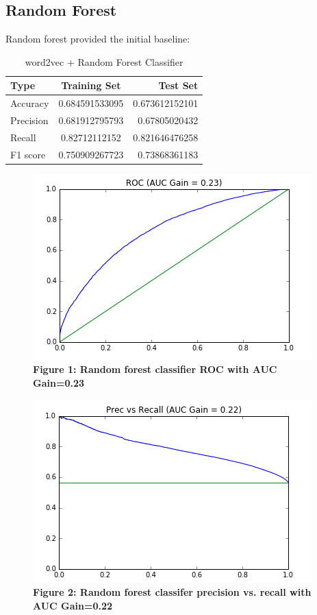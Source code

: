 \documentclass[11pt,a4paper]{article}
\begin{document}
\subsection{Random Forest}
Random forest provided the initial baseline:
\begin{table}[h!]
	\begin{center}
		\caption{word2vec + Random Forest Classifier}
		\label{tab:table1}
		\begin{tabular}{l|c|r} %
			\textbf{Type} & \textbf{Training Set} & \textbf{Test Set}\\
			\hline
			Accuracy & 0.684591533095 & 0.673612152101 \\
			Precision & 0.681912795793 & 0.67805020432 \\
			Recall & 0.82712112152  & 0.821646476258\\
			F1 score & 0.750909267723 & 0.73868361183
		\end{tabular}
	\end{center}
\end{table}


\begin{figure}[H]
	\centering\includegraphics[scale=0.55]{ROC_rf} 
	\caption{\textbf{Figure 1: Random forest classifier ROC with AUC Gain=0.23 }}
\end{figure}


\begin{figure}[H]
	\centering\includegraphics[scale=0.55]{prrc_rf} 
	\caption{\textbf{Figure 2: Random forest classifer precision vs. recall with AUC Gain=0.22 }}
\end{figure}
\end{document}
